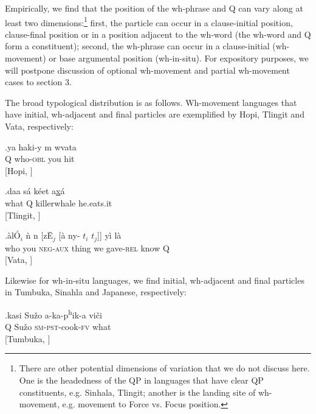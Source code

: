 \documentclass[11pt]{article}
\begin{document}
Empirically, we find that the position of the wh-phrase and Q can vary along at least two dimensions:\footnote{There are other potential dimensions of variation that we do not discuss here. One is the headedness of the QP in languages that have clear QP constituents, e.g. Sinhala, Tlingit; another is the landing site of wh-movement, e.g. movement to Force vs. Focus position.} first, the particle can occur in a clause-initial position, clause-final position or in a position adjacent to the wh-word (the wh-word and Q form a constituent); second, the wh-phrase can occur in a clause-initial (wh-movement) or base argumental position (wh-in-situ). For expository purposes, we will postpone discussion of optional wh-movement and partial wh-movement cases to section 3.

The broad typological distribution is as follows. Wh-movement languages that have initial, wh-adjacent and final particles are exemplified by Hopi, Tlingit and Vata, respectively:


\exg.\label{wh.50}ya haki-y {\textraiseglotstop\textbari}m w{\textbari}va{\textraiseglotstop}ta \\
  Q who-\textsc{obl} you hit \\
  \hspace{\fill}[Hopi, \cite{jeanne:1978}]

\exg.\label{wh.60}daa s\'a k\'eet a\underline{x}\'a \\
  what Q killerwhale he.eats.it \\
  \hspace{\fill}[Tlingit, \cite{cable:2007}]

\exg.\label{wh.70}\`al\'O$_i$ \`n n{} [z\={E}$_j$ [\`a ny{}-{} $t_i$ $t_j$]] y\`i l\`a\\
  who you \textsc{neg-aux} thing we gave-\textsc{rel} {} {} know Q \\
  \hspace{\fill}[Vata, \cite{koopman:1984}]

Likewise for wh-in-situ languages, we find initial, wh-adjacent and final particles in Tumbuka, Sinahla and Japanese, respectively:

\exg.\label{wh.80}kasi Su\v{z}o a-ka-p\textsuperscript{h}ik-a vi\v{c}i \\
  Q Su\v{z}o \textsc{sm-pst}-cook-\textsc{fv} what \\
  \hspace{\fill}[Tumbuka, \cite{kimper:2006}]
\end{document}
